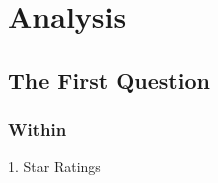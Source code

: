 \documentclass[12pt]{article}
\begin{document}
\section{Analysis}
\subsection{ The First Question}
\subsubsection{Within}
\par
1. Star Ratings
\par
\quad\par\quad\par\quad\par\quad\par\quad\par\quad\par\quad\par\quad\par\quad\par\quad\par
\end{document}
